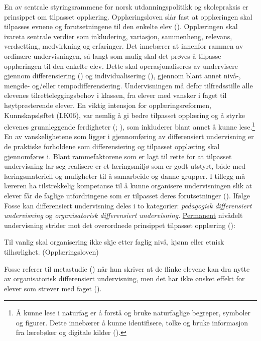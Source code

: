 \documentclass[main.tex]{subfiles}
\begin{document}
En av sentrale styringsrammene for norsk utdanningspolitikk og skolepraksis er prinsippet om tilpasset opplæring. Opplæringsloven slår fast at opplæringen skal tilpasses evnene og forutsetningene til den enkelte elev (). Opplæringen skal ivareta sentrale verdier som inkludering, variasjon, sammenheng, relevans, verdsetting, medvirkning og erfaringer. Det innebærer at innenfor rammen av ordinære undervisningen, så langt som mulig skal det prøves å tilpasse opplæringen til den enkelte elev. Dette skal operasjonaliseres av undervisere gjennom differensiering () og individualisering (), gjennom blant annet nivå-, mengde- og/eller tempodifferensiering. Undervisningen må defor tilfredsstille alle elevenes tilretteleggingsbehov i klassen, fra elever med vansker i faget til høytpresterende elever. En viktig intensjon for opplæringsreformen, Kunnskapsløftet (LK06), var nemlig å gi bedre tilpasset opplæring og å styrke elevenes grunnleggende ferdigheter (; ), som inkluderer blant annet å kunne lese.\footnote{Å kunne lese i naturfag er å forstå og bruke naturfaglige begreper, symboler og figurer. Dette innebærer å kunne identifisere, tolke og bruke informasjon fra lærebøker og digitale kilder ().}
\newline\newline
En av vanskelighetene som ligger i gjennomføring av differensiert undervisning er de praktiske forholdene som differensiering og tilpasset opplæring skal gjennomføres i. Blant rammefaktorene som er lagt til rette for at tilpasset undervisning lar seg realisere er et læringsmiljø som er godt utstyrt, både med læringsmateriell og muligheter til å samarbeide og danne grupper. I tillegg må læreren ha tilstrekkelig kompetanse til å kunne organisere undervisningen  slik at elever får de faglige utfordringene som er tilpasset deres forutsetninger ().
\newline\newline
Ifølge Fosse kan differensiert undervisning deles i to kategorier: \emph{pedagogisk differensiert undervisning} og \emph{organisatorisk differensiert undervisning}. \underline{Permanent} nivådelt undervisning strider mot det overordnede prinsippet tilpasset opplæring ():
\begin{displayquote}
\textelp{} Til vanlig skal organisering ikke skje etter faglig nivå, kjønn eller etnisk tilhørlighet. (Opplæringsloven)
\end{displayquote}
Fosse referer til metastudie () når hun skriver at de flinke elevene kan dra nytte av organisatorisk differensiert undervisning, men det har ikke ønsket effekt for elever som strever med faget ().
\end{document}
